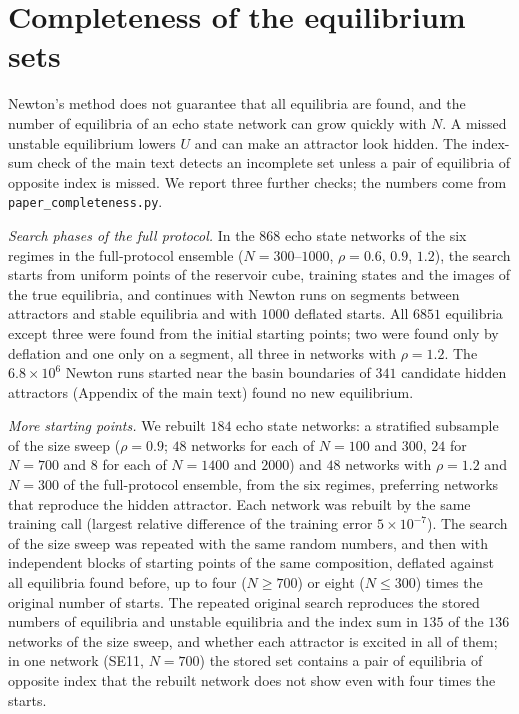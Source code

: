 \documentclass[aip,cha,preprint,amsmath,amssymb,longbibliography]{revtex4-2}
\begin{document}
\section{Completeness of the equilibrium sets}
\label{sec:sm_complete}

Newton's method does not guarantee that all equilibria are found, and the number of equilibria of an echo state network can
grow quickly with $N$. A missed unstable equilibrium lowers $U$ and can make an attractor look hidden. The index-sum check
of the main text detects an incomplete set unless a pair of equilibria of opposite index is missed. We report three further
checks; the numbers come from \texttt{paper\_completeness.py}.

\emph{Search phases of the full protocol.} In the $868$ echo state networks of the six regimes in the full-protocol ensemble
($N=300$--$1000$, $\rho=0.6$, $0.9$, $1.2$), the search starts from uniform points of the reservoir cube, training states
and the images of the true equilibria, and continues with Newton runs on segments between attractors and stable
equilibria and with $1000$ deflated starts. All $6851$ equilibria except three were found from the initial starting
points; two were found only by deflation and one only on a segment, all three in networks with $\rho=1.2$. The
$6.8\times10^6$ Newton runs started near the basin boundaries of $341$ candidate hidden attractors (Appendix of the main
text) found no new equilibrium.

\emph{More starting points.} We rebuilt $184$ echo state networks: a stratified subsample of the size sweep ($\rho=0.9$;
$48$ networks for each of $N=100$ and $300$, $24$ for $N=700$ and $8$ for each of $N=1400$ and $2000$) and $48$ networks
with $\rho=1.2$ and $N=300$ of the full-protocol ensemble, from the six regimes, preferring networks that reproduce the
hidden attractor. Each network was rebuilt by the same training call (largest relative difference of the training error
$5\times10^{-7}$). The search of the size sweep was repeated with the same random numbers, and then with independent
blocks of starting points of the same composition, deflated against all equilibria found before, up to four ($N\ge700$) or
eight ($N\le300$) times the original number of starts. The repeated original search reproduces the stored numbers of
equilibria and unstable equilibria and the index sum in $135$ of the $136$ networks of the size sweep, and whether each
attractor is excited in all of them; in one network (SE11, $N=700$) the stored set contains a pair of equilibria of
opposite index that the rebuilt network does not show even with four times the starts.
\end{document}
